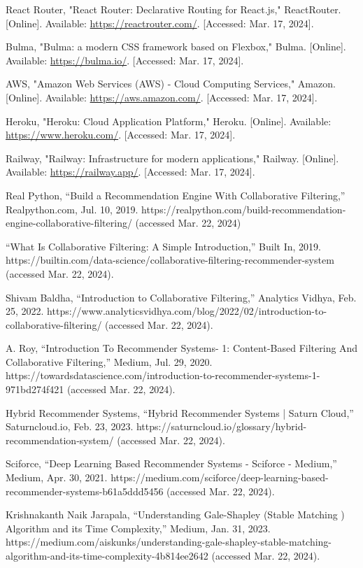 \documentclass{report}
\begin{document}
\begin{thebibliography}{}
     React Router, "React Router: Declarative Routing for React.js," ReactRouter. [Online]. Available: \url{https://reactrouter.com/}. [Accessed: Mar. 17, 2024].

     Bulma, "Bulma: a modern CSS framework based on Flexbox," Bulma. [Online]. Available: \url{https://bulma.io/}. [Accessed: Mar. 17, 2024].

     AWS, "Amazon Web Services (AWS) - Cloud Computing Services," Amazon. [Online]. Available: \url{https://aws.amazon.com/}. [Accessed: Mar. 17, 2024].

     Heroku, "Heroku: Cloud Application Platform," Heroku. [Online]. Available: \url{https://www.heroku.com/}. [Accessed: Mar. 17, 2024].

     Railway, "Railway: Infrastructure for modern applications," Railway. [Online]. Available: \url{https://railway.app/}. [Accessed: Mar. 17, 2024].

    Real Python, “Build a Recommendation Engine With Collaborative Filtering,” Realpython.com, Jul. 10, 2019. https://realpython.com/build-recommendation-engine-collaborative-filtering/ (accessed Mar. 22, 2024)

    “What Is Collaborative Filtering: A Simple Introduction,” Built In, 2019. https://builtin.com/data-science/collaborative-filtering-recommender-system (accessed Mar. 22, 2024).

     Shivam Baldha, “Introduction to Collaborative Filtering,” Analytics Vidhya, Feb. 25, 2022. https://www.analyticsvidhya.com/blog/2022/02/introduction-to-collaborative-filtering/ (accessed Mar. 22, 2024).

     A. Roy, “Introduction To Recommender Systems- 1: Content-Based Filtering And Collaborative Filtering,” Medium, Jul. 29, 2020. https://towardsdatascience.com/introduction-to-recommender-systems-1-971bd274f421 (accessed Mar. 22, 2024).

     Hybrid Recommender Systems, “Hybrid Recommender Systems | Saturn Cloud,” Saturncloud.io, Feb. 23, 2023. https://saturncloud.io/glossary/hybrid-recommendation-system/ (accessed Mar. 22, 2024).

     Sciforce, “Deep Learning Based Recommender Systems - Sciforce - Medium,” Medium, Apr. 30, 2021. https://medium.com/sciforce/deep-learning-based-recommender-systems-b61a5ddd5456 (accessed Mar. 22, 2024).

     Krishnakanth Naik Jarapala, “Understanding Gale-Shapley (Stable Matching ) Algorithm and its Time Complexity,” Medium, Jan. 31, 2023. https://medium.com/aiskunks/understanding-gale-shapley-stable-matching-algorithm-and-its-time-complexity-4b814ee2642 (accessed Mar. 22, 2024).


\end{thebibliography}
\end{document}
